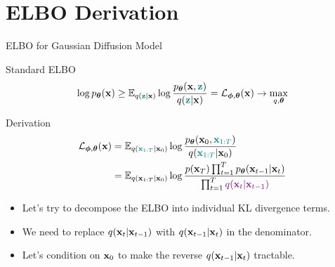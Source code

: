 \documentclass{beamer}
\renewcommand{\eqpause}{}
\renewcommand{\nextonslide}[1]{#1}
\begin{document}
\section{ELBO Derivation}
\begin{frame}{ELBO for Gaussian Diffusion Model}
    \begin{block}{Standard ELBO}
        \vspace{-0.3cm}
        \[
            \log p_{\boldsymbol{\theta}}(\mathbf{x}) \geq \mathbb{E}_{q({\color{teal}\mathbf{z}} | \mathbf{x})} \log \frac{p_{\boldsymbol{\theta}}(\mathbf{x}, {\color{teal}\mathbf{z}})}{q({\color{teal}\mathbf{z}} | \mathbf{x})} = \mathcal{L}_{\boldsymbol{\phi}, \boldsymbol{\theta}}(\mathbf{x}) \rightarrow \max_{q, \boldsymbol{\theta}}
        \]
        \vspace{-0.5cm}
    \end{block}
    \eqpause
    \begin{block}{Derivation}
        \vspace{-0.5cm}
        \begin{align*}
            \cL_{\bphi, \btheta}(\bx) &= \bbE_{q({\color{teal}\bx_{1:T}} | \bx_0)} \log \frac{\pt(\bx_0, {\color{teal}\bx_{1:T}})}{q({\color{teal}\bx_{1:T}} | \bx_0)} \\
            \nextonslide{& = \bbE_{q(\bx_{1:T} | \bx_0)} \log \frac{p(\bx_T) \prod_{t=1}^T \pt(\bx_{t-1} | \bx_t) }{\prod_{t=1}^T {\color{violet}q(\bx_t | \bx_{t-1})}}}
        \end{align*}
        \vspace{-0.3cm}
        \eqpause
        \begin{itemize}
            \item Let's try to decompose the ELBO into individual KL divergence terms.
            \item We need to replace $q(\mathbf{x}_t | \mathbf{x}_{t - 1})$ with $q(\mathbf{x}_{t - 1} | \mathbf{x}_t)$ in the denominator.
            \item Let's condition on $\mathbf{x}_0$ to make the reverse $q(\mathbf{x}_{t - 1} | \mathbf{x}_t)$ tractable.
        \end{itemize}
    \end{block}
\end{frame}
\end{document}
